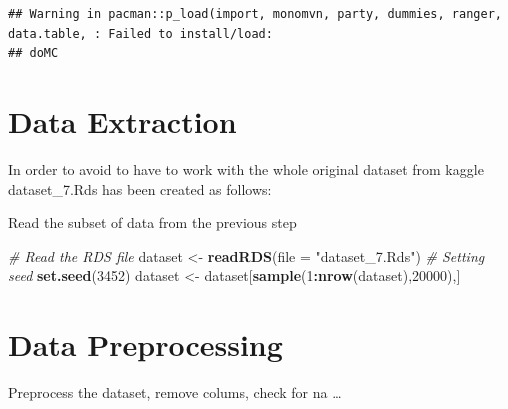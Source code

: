 \documentclass[]{article}
\newenvironment{Shaded}{\begin{snugshade}}{\end{snugshade}}
\newcommand{\CommentTok}[1]{\textcolor[rgb]{0.56,0.35,0.01}{\textit{#1}}}
\newcommand{\DataTypeTok}[1]{\textcolor[rgb]{0.13,0.29,0.53}{#1}}
\newcommand{\DecValTok}[1]{\textcolor[rgb]{0.00,0.00,0.81}{#1}}
\newcommand{\KeywordTok}[1]{\textcolor[rgb]{0.13,0.29,0.53}{\textbf{#1}}}
\newcommand{\NormalTok}[1]{#1}
\newcommand{\OperatorTok}[1]{\textcolor[rgb]{0.81,0.36,0.00}{\textbf{#1}}}
\newcommand{\StringTok}[1]{\textcolor[rgb]{0.31,0.60,0.02}{#1}}
\begin{document}
\begin{verbatim}
## Warning in pacman::p_load(import, monomvn, party, dummies, ranger, data.table, : Failed to install/load:
## doMC
\end{verbatim}

\pagebreak

\hypertarget{data-extraction}{%
\section{Data Extraction}\label{data-extraction}}

In order to avoid to have to work with the whole original dataset from
kaggle dataset\_7.Rds has been created as follows:

Read the subset of data from the previous step

\begin{Shaded}
\begin{Highlighting}[]
\CommentTok{# Read the RDS file}
\NormalTok{dataset <-}\StringTok{ }\KeywordTok{readRDS}\NormalTok{(}\DataTypeTok{file =} \StringTok{"dataset_7.Rds"}\NormalTok{)}
\CommentTok{# Setting seed}
\KeywordTok{set.seed}\NormalTok{(}\DecValTok{3452}\NormalTok{)}
\NormalTok{dataset <-}\StringTok{ }\NormalTok{dataset[}\KeywordTok{sample}\NormalTok{(}\DecValTok{1}\OperatorTok{:}\KeywordTok{nrow}\NormalTok{(dataset),}\DecValTok{20000}\NormalTok{),]}
\end{Highlighting}
\end{Shaded}

\hypertarget{data-preprocessing}{%
\section{Data Preprocessing}\label{data-preprocessing}}

Preprocess the dataset, remove colums, check for na \ldots{}
\end{document}

